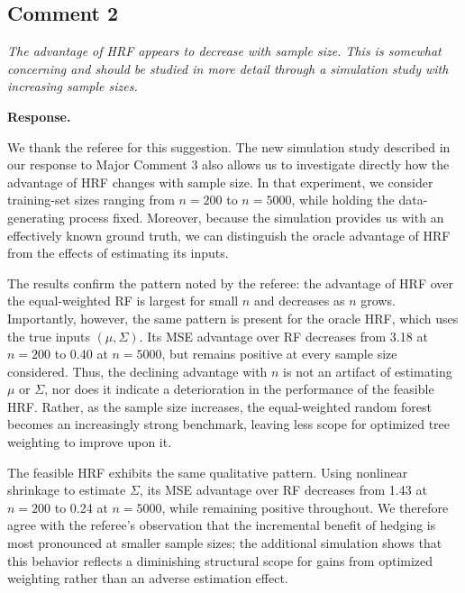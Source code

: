 \documentclass[12pt]{article}
\newcommand{\comment}[1]{\begin{refbox}\itshape #1\end{refbox}}
\newcommand{\response}{\medskip\noindent\textbf{Response.}\ }
\begin{document}
\subsection*{Comment 2}

\comment{The advantage of HRF appears to decrease with sample size. This is
somewhat concerning and should be studied in more detail through a
simulation study with increasing sample sizes.}

\response

    We thank the referee for this suggestion. The new simulation study described in our response to Major Comment 3 also allows us to investigate directly how the advantage of HRF changes with sample size. In that experiment, we consider training-set sizes ranging from $n=200$ to $n=5000$, while holding the data-generating process fixed. Moreover, because the simulation provides us with an effectively known ground truth, we can distinguish the oracle advantage of HRF from the effects of estimating its inputs.
    
The results confirm the pattern noted by the referee: the advantage of HRF over the equal-weighted RF is largest for small $n$ and decreases as $n$ grows. Importantly, however, the same pattern is present for the oracle HRF, which uses the true inputs $(\mu,\Sigma)$. Its MSE advantage over RF decreases from 3.18 at $n=200$ to 0.40 at $n=5000$, but remains positive at every sample size considered. Thus, the declining advantage with $n$ is not an artifact of estimating $\mu$ or $\Sigma$, nor does it indicate a deterioration in the performance of the feasible HRF. Rather, as the sample size increases, the equal-weighted random forest becomes an increasingly strong benchmark, leaving less scope for optimized tree weighting to improve upon it.

The feasible HRF exhibits the same qualitative pattern. Using nonlinear shrinkage to estimate $\Sigma$, its MSE advantage over RF decreases from 1.43 at $n=200$ to 0.24 at $n=5000$, while remaining positive throughout. We therefore agree with the referee's observation that the incremental benefit of hedging is most pronounced at smaller sample sizes; the additional simulation shows that this behavior reflects a diminishing structural scope for gains from optimized weighting rather than an adverse estimation effect.
\end{document}
